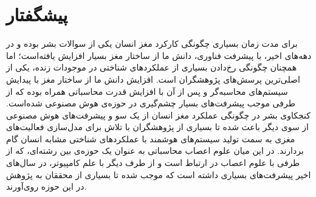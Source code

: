 \documentclass[12pt]{report}
\begin{document}
	
	\onehalfspacing
	
	\chapter*{پیشگفتار }
	برای مدت زمان بسیاری چگونگی کارکرد مغز انسان یکی از سوالات بشر بوده و در دهه‌های اخیر، با پیشرفت فناوری، دانش ما از ساختار مغز بسیار افزایش یافته‌‌است؛ اما همچنان چگونگی رخ‌دادن بسیاری از عملکرد‌های شناختی در موجودات زنده، یکی از اصلی‌ترین پرسش‌های پژوهشگران است. افزایش دانش ما از ساختار مغز با پیدایش سیستم‌های محاسبه‌گر و پس از آن با افزایش قدرت محاسباتی همراه بوده که از طرفی موجب پیشرفت‌های بسیار چشم‌گیری در حوزه‌ی هوش مصنوعی شده‌است. کنجکاوی بشر در چگونگی عملکرد مغز انسان از یک سو و پیشرفت‌های هوش مصنوعی از سوی دیگر باعث شده تا بسیاری از پژوهشگران با تلاش برای مدل‌سازی فعالیت‌های مغزی به سمت تولید سیستم‌های هوشمند با عملکرد‌های شناختی مشابه انسان گام بردارند. در این میان علوم ‌اعصاب محاسباتی به عنوان یک حوزه‌ی بین رشته‌ای، که از طرفی با علوم اعصاب در ارتباط است و از طرف دیگر با علم کامپیوتر، در سال‌های اخیر پیشرفت‌های بسیاری داشته است که موجب شده تا بسیاری از محققان به پژوهش در این حوزه روی‌آورند.
	
\end{document}
